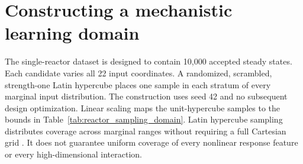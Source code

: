 \section{Constructing a mechanistic learning domain}

The single-reactor dataset is designed to contain 10,000 accepted steady states. Each candidate varies all 22 input coordinates. A randomized, scrambled, strength-one Latin hypercube places one sample in each stratum of every marginal input distribution. The construction uses seed 42 and no subsequent design optimization. Linear scaling maps the unit-hypercube samples to the bounds in Table~\ref{tab:reactor_sampling_domain}. Latin hypercube sampling distributes coverage across marginal ranges without requiring a full Cartesian grid \citep{McKay1979}. It does not guarantee uniform coverage of every nonlinear response feature or every high-dimensional interaction.


